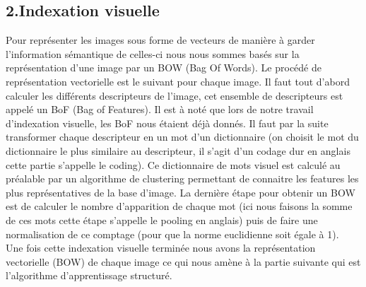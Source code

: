 \documentclass[a4paper,11pt]{report}
\begin{document}
\subsection*{2.Indexation visuelle}
Pour représenter les images sous forme de vecteurs de manière à garder l'information sémantique de celles-ci nous nous sommes basés sur la représentation d'une image par un BOW (Bag Of Words). Le procédé de représentation vectorielle est le suivant pour chaque image. Il faut tout d'abord calculer les différents descripteurs de l'image, cet ensemble de descripteurs est appelé un BoF (Bag of Features). Il est à noté que lors de notre travail d'indexation visuelle, les BoF nous étaient déjà donnés. Il faut par la suite transformer chaque descripteur en un mot d'un dictionnaire (on choisit le mot du dictionnaire le plus similaire au descripteur, il s'agit d'un codage dur en anglais cette partie s'appelle le coding). Ce dictionnaire de mots visuel est calculé au préalable par un algorithme de clustering permettant de connaitre les features les plus représentatives de la base d'image. La dernière étape pour obtenir un BOW est de calculer le nombre d'apparition de chaque mot (ici nous faisons la somme de ces mots cette étape s'appelle le pooling en anglais) puis de faire une normalisation de ce comptage (pour que la norme euclidienne soit égale à 1). \\
Une fois cette indexation visuelle terminée nous avons la représentation vectorielle (BOW) de chaque image ce qui nous amène à la partie suivante qui est l'algorithme d'apprentissage structuré.
\end{document}
